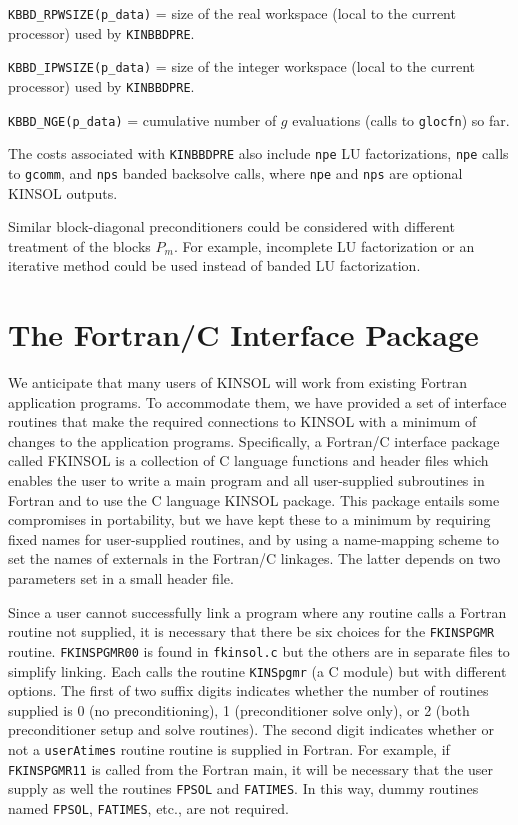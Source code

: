 \begin{description}
\item  {\tt KBBD\_RPWSIZE(p\_data)} = size of the real workspace (local to
the current processor) used by {\tt KINBBDPRE}.

\item  {\tt KBBD\_IPWSIZE(p\_data)} = size of the integer workspace (local to
the current processor) used by {\tt KINBBDPRE}.

\item  {\tt KBBD\_NGE(p\_data)} = cumulative number of $g$ evaluations (calls
to {\tt glocfn}) so far.
\end{description}

The costs associated with {\tt KINBBDPRE} also include {\tt npe} LU
factorizations, {\tt npe} calls to {\tt gcomm}, and {\tt nps} banded
backsolve calls, where {\tt npe} and {\tt nps} are optional KINSOL
outputs.

Similar block-diagonal preconditioners could be considered with different
treatment of the blocks $P_m$. For example, incomplete LU factorization or
an iterative method could be used instead of banded LU factorization.


\section{The Fortran/C Interface Package}

We anticipate that many users of KINSOL will work from existing Fortran
application programs.  To accommodate them, we have provided a set of
interface routines that make the required connections to KINSOL with a
minimum of changes to the application programs.  Specifically, a
Fortran/C interface package called FKINSOL is a collection of C
language functions and header files which enables the user to write a
main program and all user-supplied subroutines in Fortran and to use
the C language KINSOL package.  This package entails some compromises
in portability, but we have kept these to a minimum by requiring fixed
names for user-supplied routines, and by using a name-mapping scheme
to set the names of externals in the Fortran/C linkages.  The latter
depends on two parameters set in a small header file.


Since a user cannot successfully link a program where any routine calls a 
Fortran routine not supplied, it is necessary that there be six choices for 
the {\tt FKINSPGMR} routine. {\tt FKINSPGMR00} is found in {\tt fkinsol.c} but
the others are in separate files to simplify linking. Each calls the routine 
{\tt KINSpgmr} (a C module) but with different options. The first of two suffix
digits indicates whether the number of routines supplied is 0 (no 
preconditioning), 1 (preconditioner solve only), or 2 (both preconditioner 
setup and solve routines). The second digit indicates whether or not a 
{\tt userAtimes} routine routine is supplied in Fortran. For example, if 
{\tt FKINSPGMR11} is called from the Fortran main, it will be necessary that 
the user supply as well the routines {\tt FPSOL} and {\tt FATIMES}. In this 
way, dummy routines named {\tt FPSOL}, {\tt FATIMES}, etc., are not required.



